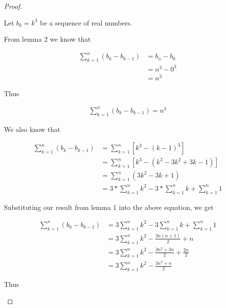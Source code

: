 \documentclass{article}
\begin{document}
\begin{proof}
\begin{flushleft}
Let $b_{k} = k^3$ be a sequence of real numbers. 
\end{flushleft}

\begin{flushleft}
From lemma 2 we know that
\end{flushleft}

\begin{align*}
\sum_{k=1}^{n} (b_{k} - b_{k-1}) &= b_{n} - b_{0} \\
&= n^3 - 0^3 \\
&= n^3
\end{align*}

\begin{flushleft}
Thus 
\end{flushleft}

\begin{align}
\sum_{k=1}^{n} (b_{k} - b_{k-1}) = n^3
\end{align}

\begin{flushleft}
We also know that 
\end{flushleft}

\begin{align*}
\sum_{k=1}^{n} (b_{k} - b_{k-1}) &= \sum_{k=1}^{n} [k^3 - (k-1)^3] \\
&= \sum_{k=1}^{n} [k^3 - (k^3 - 3k^2 + 3k - 1)] \\
&= \sum_{k=1}^{n} (3k^2 - 3k + 1) \\
&= 3 * \sum_{k=1}^{n} k^2 - 3 * \sum_{k=1}^{n} k + \sum_{k=1}^{n} 1
\end{align*}

\begin{flushleft}
Substituting our result from lemma 1 into the above equation, we get
\end{flushleft}

\begin{align*}
\sum_{k=1}^{n} (b_{k} - b_{k-1}) &= 3 \sum_{k=1}^{n} k^2 - 3 \sum_{k=1}^{n} k + \sum_{k=1}^{n} 1 \\
&= 3 \sum_{k=1}^{n} k^2 - \frac{3n(n+1)}{2} + n \\
&= 3 \sum_{k=1}^{n} k^2 - \frac{3n^2+3n}{2} + \frac{2n}{2} \\
&=  3 \sum_{k=1}^{n} k^2 - \frac{3n^2+n}{2}
\end{align*}

\begin{flushleft}
Thus 
\end{flushleft}


\end{proof}
\end{document}
